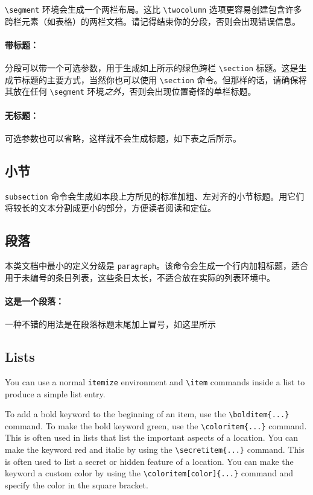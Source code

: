 \documentclass[
]{dragonbane-supplement}
\begin{document}
\begin{segment}[Segments]
\texttt{\textbackslash segment} 环境会生成一个两栏布局。这比 \texttt{\textbackslash twocolumn} 选项更容易创建包含许多跨栏元素（如表格）的两栏文档。请记得结束你的分段，否则会出现错误信息。

\paragraph{带标题：}
分段可以带一个可选参数，用于生成如上所示的绿色跨栏 \texttt{\textbackslash section} 标题。这是生成节标题的主要方式，当然你也可以使用 \texttt{\textbackslash section} 命令。但那样的话，请确保将其放在任何 \texttt{\textbackslash segment} 环境\emph{之外}，否则会出现位置奇怪的单栏标题。

\paragraph{无标题：}
可选参数也可以省略，这样就不会生成标题，如下表之后所示。

\subsection{小节}
\texttt{subsection} 命令会生成如本段上方所见的标准加粗、左对齐的小节标题。用它们将较长的文本分割成更小的部分，方便读者阅读和定位。

\subsection{段落}
本类文档中最小的定义分级是 \texttt{paragraph}。该命令会生成一个行内加粗标题，适合用于未编号的条目列表，这些条目太长，不适合放在实际的列表环境中。

\paragraph{这是一个段落：}
一种不错的用法是在段落标题末尾加上冒号，如这里所示


\subsection{Lists}
You can use a normal \texttt{itemize} environment and \texttt{\textbackslash item} commands inside a list to produce a simple list entry.

\begin{itemize}
     To add a bold keyword to the beginning of an item, use the \texttt{\textbackslash bolditem\{...\}} command.
     To make the bold keyword green, use the \texttt{\textbackslash coloritem\{...\}} command. This is often used in lists that list the important aspects of a location.
     You can make the keyword red and italic by using the \texttt{\textbackslash secretitem\{...\}} command. This is often used to list a secret or hidden feature of a location.
      You can make the keyword a custom color by using the \texttt{\textbackslash coloritem[color]\{...\}} command and specify the color in the square bracket.
\end{itemize}
\end{segment}
\end{document}
